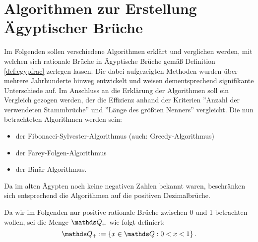 \section{Algorithmen zur Erstellung Ägyptischer Brüche}\label{sec:algorithmen}
Im Folgenden sollen verschiedene Algorithmen erklärt und verglichen werden, mit welchen sich rationale Brüche in Ägyptische Brüche gemäß Definition \ref{def:egypfrac} zerlegen lassen. Die dabei aufgezeigten Methoden wurden über mehrere Jahrhunderte hinweg entwickelt und weisen dementsprechend signifikante Unterschiede auf. Im Anschluss an die Erklärung der Algorithmen soll ein Vergleich gezogen werden, der die Effizienz anhand der Kriterien ''Anzahl der verwendeten Stammbrüche'' und ''Länge des größten Nenners'' vergleicht.
Die nun betrachteten Algorithmen werden sein:
\begin{itemize}
	\item der Fibonacci-Sylvester-Algorithmus (auch: Greedy-Algorithmus)
	\item der Farey-Folgen-Algorithmus
	\item der Binär-Algorithmus.
\end{itemize}

Da im alten Ägypten noch keine negativen Zahlen bekannt waren, beschränken sich entsprechend die Algorithmen auf die positiven Dezimalbrüche.
\begin{def1}
	Da wir im Folgenden nur positive rationale Brüche zwischen 0 und 1 betrachten wollen, sei die Menge $\Q_+$ wie folgt definiert:
	$$\Q_+ := \left\{x \in \Q: 0<x<1\right\}.$$
\end{def1}